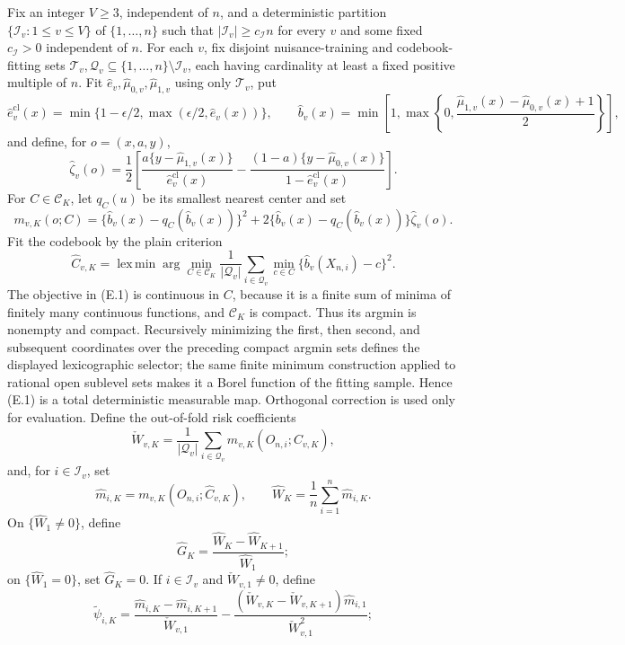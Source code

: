 Fix an integer \(V\geq3\), independent of \(n\), and a deterministic partition \(\{\mathcal I_v:1\leq v\leq V\}\) of \(\{1,\ldots,n\}\) such that \(|\mathcal I_v|\geq c_{\mathcal I}n\) for every \(v\) and some fixed \(c_{\mathcal I}>0\) independent of \(n\).  For each \(v\), fix disjoint nuisance-training and codebook-fitting sets \(\mathcal T_v,\mathcal Q_v\subseteq\{1,\ldots,n\}\setminus\mathcal I_v\), each having cardinality at least a fixed positive multiple of \(n\).  Fit \(\widehat e_v,\widehat\mu_{0,v},\widehat\mu_{1,v}\) using only \(\mathcal T_v\), put
\[
 \widehat e_v^{\mathrm{cl}}(x)=\min\{1-\epsilon/2,\max(\epsilon/2,\widehat e_v(x))\},
 \qquad
 \widehat b_v(x)=\min\!\left[1,\max\!\left\{0,
 \frac{\widehat\mu_{1,v}(x)-\widehat\mu_{0,v}(x)+1}{2}\right\}\right],
\]
and define, for \(o=(x,a,y)\),
\[
 \widehat\zeta_v(o)=\frac12\left[
 \frac{a\{y-\widehat\mu_{1,v}(x)\}}{\widehat e_v^{\mathrm{cl}}(x)}
 -\frac{(1-a)\{y-\widehat\mu_{0,v}(x)\}}{1-\widehat e_v^{\mathrm{cl}}(x)}\right].
\]
For \(C\in\mathcal C_K\), let \(q_C(u)\) be its smallest nearest center and set
\[
 m_{v,K}(o;C)=\{\widehat b_v(x)-q_C(\widehat b_v(x))\}^2
 +2\{\widehat b_v(x)-q_C(\widehat b_v(x))\}\widehat\zeta_v(o).
\]
Fit the codebook by the plain criterion
\[
 \widehat C_{v,K}
 =\operatorname*{lex\,min}\arg\min_{C\in\mathcal C_K}
 \frac1{|\mathcal Q_v|}\sum_{i\in\mathcal Q_v}
 \min_{c\in C}\{\widehat b_v(X_{n,i})-c\}^2.                                  \tag{E.1}
\]
The objective in (E.1) is continuous in \(C\), because it is a finite sum of minima of finitely many continuous functions, and \(\mathcal C_K\) is compact.  Thus its argmin is nonempty and compact.  Recursively minimizing the first, then second, and subsequent coordinates over the preceding compact argmin sets defines the displayed lexicographic selector; the same finite minimum construction applied to rational open sublevel sets makes it a Borel function of the fitting sample.  Hence (E.1) is a total deterministic measurable map.  Orthogonal correction is used only for evaluation.  Define the out-of-fold risk coefficients
\[
 \check W_{v,K}=\frac1{|\mathcal Q_v|}\sum_{i\in\mathcal Q_v}
 m_{v,K}(O_{n,i};\widehat C_{v,K}),
\]
and, for \(i\in\mathcal I_v\), set
\[
 \widehat m_{i,K}=m_{v,K}(O_{n,i};\widehat C_{v,K}),
 \qquad
 \widehat W_K=\frac1n\sum_{i=1}^n\widehat m_{i,K}.
\]
On \(\{\widehat W_1\neq0\}\), define
\[
 \widehat G_K=\frac{\widehat W_K-\widehat W_{K+1}}{\widehat W_1};
\]
on \(\{\widehat W_1=0\}\), set \(\widehat G_K=0\).  If \(i\in\mathcal I_v\) and \(\check W_{v,1}\neq0\), define
\[
 \widetilde\psi_{i,K}=
 \frac{\widehat m_{i,K}-\widehat m_{i,K+1}}{\check W_{v,1}}
 -\frac{(\check W_{v,K}-\check W_{v,K+1})\widehat m_{i,1}}{\check W_{v,1}^2};
\]

